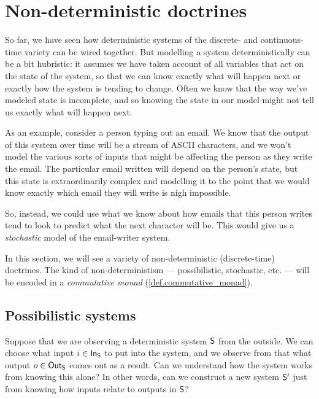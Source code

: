 \documentclass[DynamicalBook]{subfiles}
\begin{document}
%


\setcounter{chapter}{1}%


\chapter{Non-deterministic doctrines}\label{sec.non_deterministic_systems}

So far, we have seen how deterministic systems of the discrete- and
continuous-time variety can be wired together. But modelling a system
deterministically can be a bit hubristic: it assumes we have taken account of
all variables that act on the state of the system, so that we can know exactly
what will happen next or exactly how the system is tending to change. Often we
know that the way we've modeled state is incomplete, and so knowing the state in
our model might not tell us exactly what will happen next.

As an example, consider a person typing out an email. We know that the output of
this system over time will be a stream of ASCII characters, and we won't model the various sorts
of inputs that might be affecting the person as they write the email. The
particular email written will depend on the person's state, but this state is
extraordinarily complex and modelling it to the point that we would know exactly
which email they will write is nigh impossible. 

So, instead, we could use what
we know about how emails that this person writes tend to look to predict what
the next character will be. This would give us a \emph{stochastic} model of the
email-writer system.

In this section, we will see a variety of non-deterministic (discrete-time)
doctrines. The kind of non-deterministism --- possibilistic, stochastic, etc.
--- will be encoded in a \emph{commutative monad}
(\cref{def.commutative_monad}). 

\section{Possibilistic  systems}

Suppose that we are observing a deterministic system $\mathsf{S}$ from the outside.
We can choose what input $i \in \mathsf{In}_{\mathsf{S}}$ to put into the system, and we observe
from that what output $o \in \mathsf{Out}_{\mathsf{S}}$ comes out as a result. Can we understand
how the system works from knowing this alone? In other words, can we construct a
new system $\mathsf{S'}$ just from knowing how inputs relate to outputs in $\mathsf{S}$?
\end{document}
